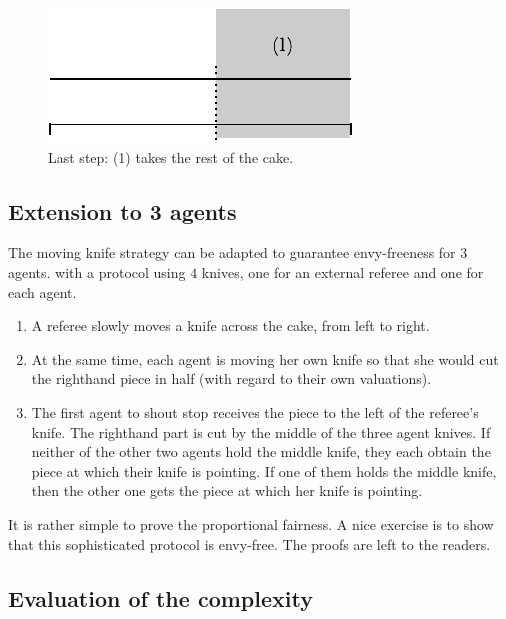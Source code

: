 \begin{figure}[htb]
\begin{center}
        \includegraphics[scale=0.6]{FiguresMaths/CakeEnvyFree4}
        \caption{Last step: (1) takes the rest of the cake.}
        \label{Fig:cakeEnvyFree4}
\end{center}
\end{figure}



\subsection{Extension to 3 agents}

The moving knife strategy can be adapted to guarantee envy-freeness for 3 agents.
with a protocol using $4$ knives, one for an external referee and one for each agent.

\begin{enumerate}
\item
A referee slowly moves a knife across the cake, from left to right.
\item
At the same time, each agent is moving her own knife so that she would cut the righthand piece in half 
(with regard to their own valuations).
\item
The first agent to shout stop receives the piece to the left of the referee’s knife. 
The righthand part is cut by the middle of the three agent knives. 
If neither of the other two agents hold the middle knife, they each obtain the piece at which their knife is pointing. 
If one of them holds the middle knife, then the other one gets the piece at which her knife is pointing.
\end{enumerate}
\bigskip

It is rather simple to prove the proportional fairness.
A nice exercise is to show that this sophisticated protocol is envy-free. The proofs are left to the readers. 


\subsection{Evaluation of the complexity}


